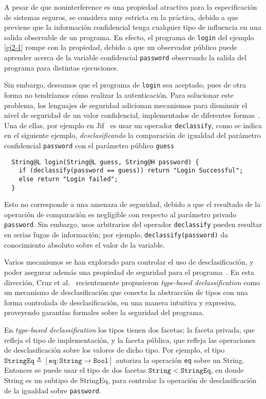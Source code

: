 A pesar de que noninterference es una propiedad atractiva para la especificación de sistemas seguros, se considera muy estricta en la práctica, debido a que previene que la información confidencial tenga cualquier tipo de influencia en una salida observable de un programa. En efecto, el programa de \texttt{login} del ejemplo \ref{ej2-1} rompe con la propiedad, debido a que un observador público puede aprender acerca de la variable confidencial \texttt{password} observando la salida del programa para distintas ejecuciones.

Sin embargo, deseamos que el programa de \texttt{login} sea aceptado, pues de otra forma no tendríamos cómo realizar la autenticación. Para solucionar este problema, los lenguajes de seguridad adicionan mecanismos para disminuir el nivel de seguridad de un valor confidencial, implementados de diferentes formas~\cite{sabelfeldSands:JCS09}. Una de ellas, por ejemplo en Jif~\cite{jif} es usar un operador \texttt{declassify}, como se indica en el siguiente ejemplo, \emph{desclasificando} la comparación de igualdad del parámetro confidencial \texttt{password} con el parámetro público \texttt{guess}

\begin{lstlisting}
  String@L login(String@L guess, String@H password) {
    if (declassify(password == guess)) return "Login Successful";
    else return "Login failed";
  }
\end{lstlisting}

Esto no corresponde a una amenaza de seguridad, debido a que el resultado de la operación de comparación es negligible con respecto al parámetro privado \texttt{password}. Sin embargo, usos arbitrarios del operador \texttt{declassify} pueden resultar en serias fugas de información; por ejemplo, \texttt{declassify(password)} da conocimiento absoluto sobre el valor de la variable.

Varios mecanismos se han explorado para controlar el uso de desclasificación, y poder asegurar además una propiedad de seguridad para el programa~\cite{sabelfeldSands:JCS09}. En esta dirección, Cruz et al.~\cite{cruzAl:ecoop2017} recientemente propusieron \textit{type-based declassification} como un mecanismo de desclasificación que conecta la abstracción de tipos con una forma controlada de desclasificación, en una manera intuitiva y expresiva, proveyendo garantías formales sobre la seguridad del programa.

En \textit{type-based declassification} los tipos tienen dos facetas; la faceta privada, que refleja el tipo de implementación, y la faceta pública, que refleja las operaciones de desclasificación sobre los valores de dicho tipo. Por ejemplo, el tipo $\mathtt{StringEq} \triangleq [\mathtt{eq} : \mathtt{String} \rightarrow \mathtt{Bool}]$ autoriza la operación \texttt{eq} sobre un String. Entonces se puede usar el tipo de dos facetas $\mathtt{String} < \mathtt{StringEq}$, en donde String es un subtipo de StringEq, para controlar la operación de desclasificación de la igualdad sobre \texttt{password}.

